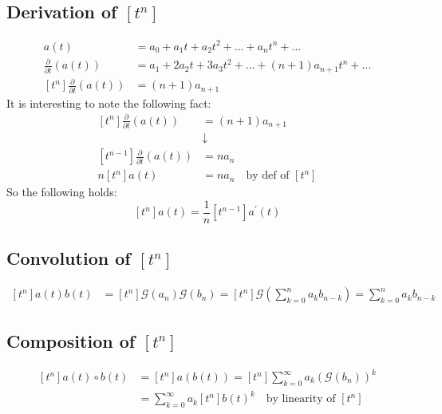 \subsection{Derivation of $[t^{n}] $}
\begin{displaymath}
  \begin{split}
    a(t) &= a_0 + a_1 t + a_2 t^2 + \ldots + a_n t^n + \ldots \\
    \frac{\partial}{\partial t}\left(a(t) \right) &= a_1 + 2a_2 t +
    3a_3 t^2+\ldots + (n+1)a_{n+1} t^n + \ldots \\
    [t^{n}] \frac{\partial}{\partial t}\left(a(t) \right) &=
    (n+1)a_{n+1}
  \end{split}
\end{displaymath}
It is interesting to note the following fact:
\begin{displaymath}
  \begin{split}
    [t^{n}] \frac{\partial}{\partial t}\left(a(t) \right) &=
    (n+1)a_{n+1}\\
    &\downarrow \\
    [t^{n-1}] \frac{\partial}{\partial t}\left(a(t) \right) &= n a_{n} \\
    n[t^{n}]a(t) &= n a_{n}\quad \text{by def of } [t^{n}]
  \end{split}
\end{displaymath}
So the following holds:
\begin{equation}
  \label{eq:implication-der-property-of-inverse-of-G}
  [t^{n}]a(t) =  \frac{1}{n} [t^{n-1}] a^{\prime}(t)
\end{equation}


\subsection{Convolution of $[t^{n}] $}
\begin{displaymath}
  \begin{split}
    [t^{n}] a(t)b(t) &= [t^{n}] \mathcal{G} (a_n) \mathcal{G} (b_n) =
    [t^{n}]\mathcal{G} \left(\sum_{k=0}^{n}{a_k b_{n-k}} \right) =
    \sum_{k=0}^{n}{a_k b_{n-k}}
  \end{split}
\end{displaymath}

\subsection{Composition of $[t^{n}] $}
\begin{displaymath}
  \begin{split}
    [t^{n}] a(t)\circ b(t) &=[t^{n}] a(b(t))
    =[t^{n}]\sum_{k=0}^{\infty}{a_k (\mathcal{G} (b_n))^k}\\
    &=\sum_{k=0}^{\infty}{a_k [t^{n}] b(t)^k} \quad \text{by linearity
      of } [t^n]
  \end{split}
\end{displaymath}

